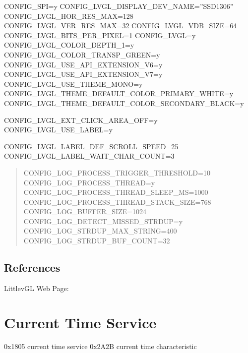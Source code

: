 \documentclass[letterpaper,10pt,english]{sphinxmanual}
\begin{document}
CONFIG\_SPI=y
CONFIG\_LVGL\_DISPLAY\_DEV\_NAME=”SSD1306”
CONFIG\_LVGL\_HOR\_RES\_MAX=128
CONFIG\_LVGL\_VER\_RES\_MAX=32
CONFIG\_LVGL\_VDB\_SIZE=64
CONFIG\_LVGL\_BITS\_PER\_PIXEL=1
CONFIG\_LVGL=y
CONFIG\_LVGL\_COLOR\_DEPTH\_1=y
CONFIG\_LVGL\_COLOR\_TRANSP\_GREEN=y
CONFIG\_LVGL\_USE\_API\_EXTENSION\_V6=y
CONFIG\_LVGL\_USE\_API\_EXTENSION\_V7=y
CONFIG\_LVGL\_USE\_THEME\_MONO=y
CONFIG\_LVGL\_THEME\_DEFAULT\_COLOR\_PRIMARY\_WHITE=y
CONFIG\_LVGL\_THEME\_DEFAULT\_COLOR\_SECONDARY\_BLACK=y

CONFIG\_LVGL\_EXT\_CLICK\_AREA\_OFF=y
CONFIG\_LVGL\_USE\_LABEL=y

CONFIG\_LVGL\_LABEL\_DEF\_SCROLL\_SPEED=25
CONFIG\_LVGL\_LABEL\_WAIT\_CHAR\_COUNT=3
\begin{quote}

CONFIG\_LOG\_PROCESS\_TRIGGER\_THRESHOLD=10
CONFIG\_LOG\_PROCESS\_THREAD=y
CONFIG\_LOG\_PROCESS\_THREAD\_SLEEP\_MS=1000
CONFIG\_LOG\_PROCESS\_THREAD\_STACK\_SIZE=768
CONFIG\_LOG\_BUFFER\_SIZE=1024
CONFIG\_LOG\_DETECT\_MISSED\_STRDUP=y
CONFIG\_LOG\_STRDUP\_MAX\_STRING=400
CONFIG\_LOG\_STRDUP\_BUF\_COUNT=32
\end{quote}


\section{References}
\label{\detokenize{lvgl:references}}

LittlevGL Web Page: 


\chapter{Current Time Service}
\label{\detokenize{current-time:current-time-service}}\label{\detokenize{current-time::doc}}
0x1805 current time service
0x2A2B current time characteristic
\end{document}
